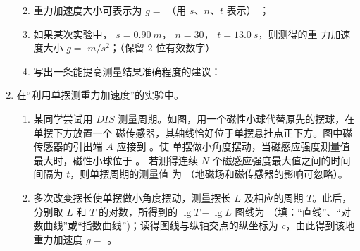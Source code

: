 \begin{enumerate}
\begin{enumerate}
\renewcommand{\labelenumi}{\arabic{enumi}.}
\item
重力加速度大小可表示为 $ g= $
（用 $ s $、$ n $、$ t $ 表示）
；

\item 
如果某次实验中， $ s=0.90 \ m $， $ n=30 $， $ t=13.0 \ s $，则测得的重
力加速度大小
$ g= $
$ m/s^{2} $；（保留 $ 2 $ 位有效数字）

\item 
写出一条能提高测量结果准确程度的建议：  


\end{enumerate}




\newpage
\item 
{}
在“利用单摆测重力加速度”的实验中。
\begin{figure}[h!]
\centering

\end{figure}
\begin{enumerate}
\renewcommand{\labelenumi}{\arabic{enumi}.}
\item
某同学尝试用 $ DIS $ 测量周期。如图，用一个磁性小球代替原先的摆球，在单摆下方放置一个
磁传感器，其轴线恰好位于单摆悬挂点正下方。图中磁传感器的引出端 $ A $ 应接到  。使
单摆做小角度摆动，当磁感应强度测量值最大时，磁性小球位于  。
若测得连续 $ N $ 个磁感应强度最大值之间的时间间隔为 $ t $，则单摆周期的测量值
为  （地磁场和磁传感器的影响可忽略）。


\item 
多次改变摆长使单摆做小角度摆动，测量摆长 $ L $ 及相应的周期 $ T $。此后，
分别取 $ L $ 和 $ T $ 的对数，所得到的 $ \lg T- \lg L $ 图线为  （填：“直线”、“对
数曲线”或“指数曲线”)；读得图线与纵轴交点的纵坐标为 $ c $，由此得到该地重力加速度
$ g= $  。




\end{enumerate}
\end{enumerate}
